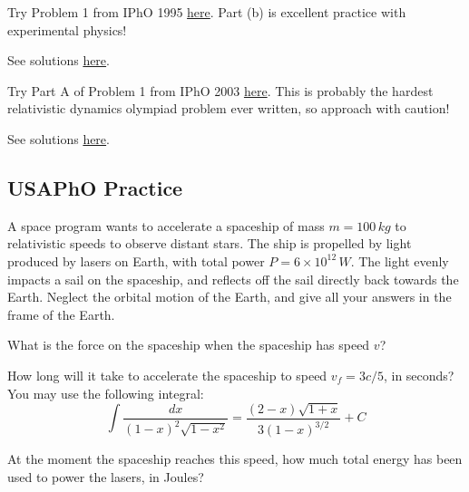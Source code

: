 \documentclass[11pt]{scrartcl}
\begin{document}
\begin{prob}[IPhO]
    Try Problem 1 from IPhO 1995 \href{https://s3.eu-central-1.amazonaws.com/physprob.com/files/ipho/1995_Australia_p1.pdf}{here}. Part (b) is excellent practice with experimental physics!
\end{prob}

\begin{sol}
    See solutions \href{https://s3.eu-central-1.amazonaws.com/physprob.com/files/ipho/1995_Australia_p1Sol.pdf}{here}.
\end{sol}

\begin{prob}[IPhO]
Try Part A of Problem 1 from IPhO 2003 \href{https://s3.eu-central-1.amazonaws.com/physprob.com/files/ipho/2003_Taiwan_p3.pdf}{here}. This is probably the hardest relativistic dynamics olympiad problem ever written, so approach with caution!
\end{prob}

\begin{sol}
    See solutions \href{https://s3.eu-central-1.amazonaws.com/physprob.com/files/ipho/2003_Taiwan_p3Sol.pdf}{here}.
\end{sol}


\subsection{USAPhO Practice}

\begin{prob}[USAPhO 2023 B2]
A space program wants to accelerate a spaceship of mass $m = 100 \,\unit{kg}$ to relativistic speeds to observe distant stars. The ship is propelled by light produced by lasers on Earth, with total power $P = 6 \times 10^{12}\,\unit{W}$. The light evenly impacts a sail on the spaceship, and reflects off the sail directly back towards the Earth. Neglect the orbital motion of the Earth, and give all your answers in the frame of the Earth.

\begin{anum}
    \item What is the force on the spaceship when the spaceship has speed $v$?
    \item How long will it take to accelerate the spaceship to speed $v_f = 3c/5$, in seconds? You may use the following integral: $$\int \frac{dx}{(1-x)^2\sqrt{1-x^2}}=\frac{(2-x)\sqrt{1+x}}{3(1-x)^{3/2}}+C$$
    \item At the moment the spaceship reaches this speed, how much total energy has been used to power the lasers, in Joules?
\end{anum}
\end{prob}
\end{document}

